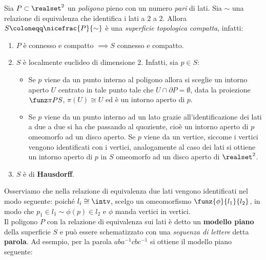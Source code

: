 \begin{observe}
	Sia $P\subset\realset^2$ un \textit{poligono} pieno con un numero \textit{pari} di lati. Sia $\sim$ una relazione di equivalenza che identifica i lati a $2$ a $2$. Allora $S\coloneqq\nicefrac{P}{\sim}$ è una \textit{superficie topologica compatta}, infatti:
		\begin{enumerate}
			\item  $P$ è connesso e compatto $\implies S$ connesso e compatto.
			\item $S$ è localmente euclideo di dimensione $2$. Infatti, sia $p\in S$:
			\begin{itemize}
				\item Se $p$ viene da un punto interno al poligono allora si sceglie un intorno aperto $U$ centrato in tale punto tale che $U\cap\partial{P}=\emptyset$, data la proiezione $\funz \pi P S$, $\pi(U)\cong U$ ed è un intorno aperto di $p$.
				\item Se $p$ viene da un punto interno ad un lato grazie all'identificazione dei lati a due a due si ha che passando al quoziente, cioè un intorno aperto di $p$ omeomorfo ad un disco aperto.
				Se $p$ viene da un vertice, siccome i vertici vengono identificati con i vertici, analogamente al caso dei lati si ottiene un intorno aperto di $p$ in $S$ omeomorfo ad un disco aperto di $\realset^2$.
			\end{itemize}  
			\item $S$ è di \textbf{Hausdorff}.
		\end{enumerate}
	Osserviamo che nella relazione di equivalenza due lati vengono identificati nel modo seguente: poiché $l_i\cong\intv$, scelgo un omeomorfismo $\funz{\phi}{l_1}{l_2}$, in modo che $p_1\in l_1 \sim \phi(p)\in l_2$ e $\phi$ manda vertici in vertici.\\
	Il poligono $P$ con la relazione di equivalenza sui lati è detto un \textbf{modello piano} della superficie $S$ e può essere schematizzato con una \textit{sequenza di lettere} detta \textbf{parola}. Ad esempio, per la parola $aba^{-1}cbc^{-1}$ si ottiene il modello piano seguente:
		\begin{center}

\end{center}
\end{observe}
